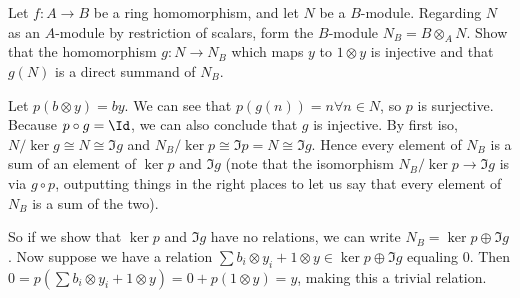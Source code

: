 \documentclass[a4paper]{exam}
\newif\ifhint
\begin{document}
\begin{questions}
	\question Let $f: A\to B$ be a ring homomorphism, and let $N$ be a $B$-module. Regarding $N$ as an $A$-module by restriction of scalars, form the $B$-module $N_B = B \otimes _A N$. Show that the homomorphism $g: N \to N_B$ which maps $y$ to $1 \otimes  y$ is injective and that $g(N)$ is a direct summand of $N_B$.
	\ifhint
		Define $p: N_B \to N_b$ by $p(b \otimes y) = by $, and show that $N_B = \Im (g) \oplus \ker (p)$.
	\fi
	\begin{solution}
		Let $p(b \otimes y) = by $.
		We can see that $p(g(n)) = n \forall n \in N $, so $p $ is surjective.
		Because $p\circ g = \Id $, we can also conclude that $g $ is injective.
		By first iso, $N / \ker g \cong N \cong \Im g $ and $N_B / \ker p \cong \Im p = N \cong \Im g $.
		Hence every element of $N_B $ is a sum of an element of $\ker p $ and $\Im g $ (note that the isomorphism $N_B / \ker p \to \Im g $ is via $g\circ p $, outputting things in the right places to let us say that every element of $N_B $ is a sum of the two).

		So if we show that $\ker p $ and $\Im g $ have no relations, we can write $N_B = \ker p \oplus \Im g $.
		Now suppose we have a relation $\sum b_i \otimes y_i + 1 \otimes y \in \ker p \oplus \Im g$ equaling 0.
		Then $0 = p(\sum b_i \otimes y_i + 1 \otimes y) = 0 + p(1 \otimes y) = y$, making this a trivial relation.
	\end{solution}


\end{questions}
\end{document}
